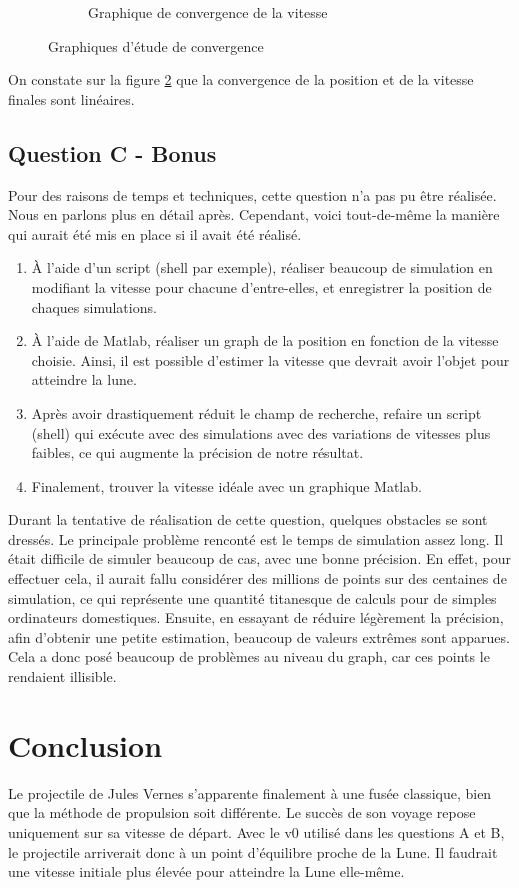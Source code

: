 \documentclass[a4paper,12pt,twoside]{article}
\begin{document}
\begin{figure}[h]
\begin{subfigure}[b]{0.45\textwidth}
		\caption{Graphique de convergence de la vitesse}
		\label{fig:B-vConv}
	\end{subfigure}
	\caption{Graphiques d'étude de convergence}
	\label{fig:B-conv}
\end{figure}

On constate sur la figure \ref{fig:B-conv} que la convergence de la position et de la vitesse finales sont linéaires.

\subsection{Question C - Bonus}
Pour des raisons de temps et techniques, cette question n'a pas pu être réalisée.
Nous en parlons plus en détail après.
Cependant, voici tout-de-même la manière qui aurait été mis en place si il avait été réalisé.
\begin{enumerate}
	\item À l'aide d'un script (shell par exemple), réaliser beaucoup de simulation en modifiant la vitesse pour chacune d'entre-elles, et enregistrer la position de chaques simulations.
	\item À l'aide de Matlab, réaliser un graph de la position en fonction de la vitesse choisie. Ainsi, il est possible d'estimer la vitesse que devrait avoir l'objet pour atteindre la lune.
	\item Après avoir drastiquement réduit le champ de recherche, refaire un script (shell) qui exécute avec des simulations avec des variations de vitesses plus faibles, ce qui augmente la précision de notre résultat.
	\item Finalement, trouver la vitesse idéale avec un graphique Matlab.
\end{enumerate}

Durant la tentative de réalisation de cette question, quelques obstacles se sont dressés.
Le principale problème renconté est le temps de simulation assez long.
Il était difficile de simuler beaucoup de cas, avec une bonne précision. 
En effet, pour effectuer cela, il aurait fallu considérer des millions de points sur des centaines de simulation, ce qui représente une quantité titanesque de calculs pour de simples ordinateurs domestiques.
Ensuite, en essayant de réduire légèrement la précision, afin d'obtenir une petite estimation, beaucoup de valeurs extrêmes sont apparues.
Cela a donc posé beaucoup de problèmes au niveau du graph, car ces points le rendaient illisible.

\section{Conclusion}
Le projectile de Jules Vernes s'apparente finalement à une fusée classique, bien que la méthode de propulsion soit différente.
Le succès de son voyage repose uniquement sur sa vitesse de départ.
Avec le v0 utilisé dans les questions A et B, le projectile arriverait donc à un point d'équilibre proche de la Lune. Il faudrait une vitesse initiale plus élevée pour atteindre la Lune elle-même.
\end{document}

